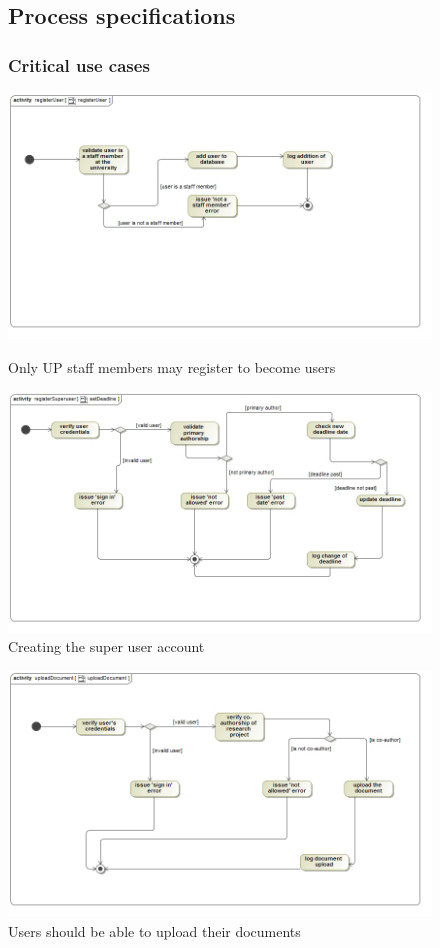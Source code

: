 \documentclass[a4paper,12pt]{report}
\begin{document}
\begin{figure}
\subsection{Process specifications}
\subsubsection{Critical use cases}
\includegraphics[scale=0.5]{act__registerUser__registerUser.jpg} 
\caption{Only UP staff members may register to become users}


\includegraphics[scale=0.5]{act__registerSuperuser__setDeadline.jpg} 
\caption{Creating the super user account}

\end{figure}
\newpage
\begin{figure}[ht]


\includegraphics[scale=0.5]{act__uploadDocument.jpg} 
\caption{Users should be able to upload their documents}


\end{figure}
\end{document}
